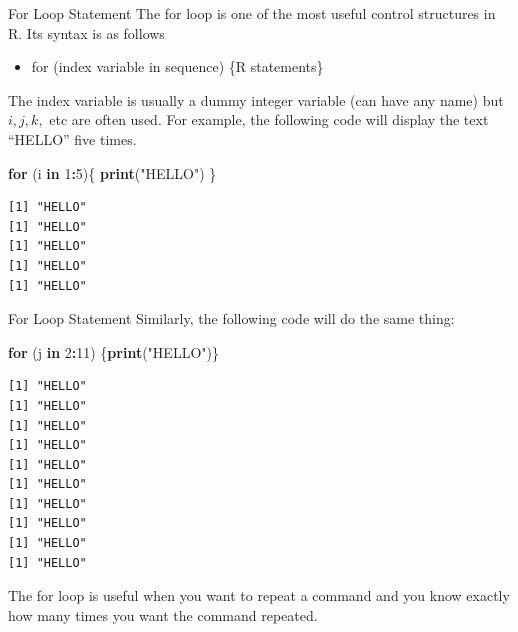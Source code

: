 \documentclass[
  ignorenonframetext,
]{beamer}
\newenvironment{Shaded}{\begin{snugshade}}{\end{snugshade}}
\newcommand{\ControlFlowTok}[1]{\textcolor[rgb]{0.13,0.29,0.53}{\textbf{#1}}}
\newcommand{\DecValTok}[1]{\textcolor[rgb]{0.00,0.00,0.81}{#1}}
\newcommand{\FunctionTok}[1]{\textcolor[rgb]{0.13,0.29,0.53}{\textbf{#1}}}
\newcommand{\NormalTok}[1]{#1}
\newcommand{\SpecialCharTok}[1]{\textcolor[rgb]{0.81,0.36,0.00}{\textbf{#1}}}
\newcommand{\StringTok}[1]{\textcolor[rgb]{0.31,0.60,0.02}{#1}}
\providecommand{\tightlist}{%
  \setlength{\itemsep}{0pt}\setlength{\parskip}{0pt}}
\begin{document}
\begin{frame}[fragile]{For Loop Statement}
\protect\hypertarget{for-loop-statement}{}
The for loop is one of the most useful control structures in R. Its
syntax is as follows

\begin{itemize}
\tightlist
\item
  for (index variable in sequence) \{R statements\}
\end{itemize}

The index variable is usually a dummy integer variable (can have any
name) but \(i, j, k,\) etc are often used. For example, the following
code will display the text ``HELLO'' five times.

\small

\begin{Shaded}
\begin{Highlighting}[]
\ControlFlowTok{for}\NormalTok{ (i }\ControlFlowTok{in} \DecValTok{1}\SpecialCharTok{:}\DecValTok{5}\NormalTok{)\{ }
  \FunctionTok{print}\NormalTok{(}\StringTok{"HELLO"}\NormalTok{) }
\NormalTok{\}}
\end{Highlighting}
\end{Shaded}

\begin{verbatim}
[1] "HELLO"
[1] "HELLO"
[1] "HELLO"
[1] "HELLO"
[1] "HELLO"
\end{verbatim}

\normalsize
\end{frame}

\begin{frame}[fragile]{For Loop Statement}
\protect\hypertarget{for-loop-statement-1}{}
Similarly, the following code will do the same thing:

\tiny

\begin{Shaded}
\begin{Highlighting}[]
\ControlFlowTok{for}\NormalTok{ (j }\ControlFlowTok{in} \DecValTok{2}\SpecialCharTok{:}\DecValTok{11}\NormalTok{)}
\NormalTok{\{}\FunctionTok{print}\NormalTok{(}\StringTok{"HELLO"}\NormalTok{)\}}
\end{Highlighting}
\end{Shaded}

\begin{verbatim}
[1] "HELLO"
[1] "HELLO"
[1] "HELLO"
[1] "HELLO"
[1] "HELLO"
[1] "HELLO"
[1] "HELLO"
[1] "HELLO"
[1] "HELLO"
[1] "HELLO"
\end{verbatim}

\normalsize

The for loop is useful when you want to repeat a command and you know
exactly how many times you want the command repeated.
\end{frame}
\end{document}
